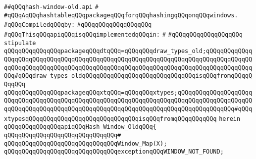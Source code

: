 \label{src/lib/x-kit/xclient/src/window/hash-window-old.api}
\verb|##qQQqhash-window-old.api|\newline
\verb|#|\newline
\verb|#qQQqAqQQqhashtableqQQqpackageqQQqforqQQqhashingqQQqonqQQqwindows.|\newline
\newline
\verb|#qQQqCompiledqQQqby:|\newline
\verb|#qQQqqQQqqQQqqQQqqQQq|\newline
\newline
\newline
\verb|#qQQqThisqQQqapiqQQqisqQQqimplementedqQQqin:|\newline
\verb|#|\newline
\verb|#qQQqqQQqqQQqqQQqqQQq|\newline
\newline
\verb|stipulate|\newline
\verb|qQQqqQQqqQQqqQQqpackageqQQqdtqQQq=qQQqqQQqdraw_types_old;qQQqqQQqqQQqqQQqqQQqqQQqqQQqqQQqqQQqqQQqqQQqqQQqqQQqqQQqqQQqqQQqqQQqqQQqqQQqqQQqqQQqqQQqqQQqqQQqqQQqqQQqqQQqqQQqqQQqqQQqqQQqqQQqqQQqqQQqqQQqqQQqqQQqqQQqqQQq#qQQqdraw_types_oldqQQqqQQqqQQqqQQqqQQqqQQqqQQqqQQqisqQQqfromqQQqqQQqqQQq|\newline
\verb|qQQqqQQqqQQqqQQqpackageqQQqxtqQQq=qQQqqQQqxtypes;qQQqqQQqqQQqqQQqqQQqqQQqqQQqqQQqqQQqqQQqqQQqqQQqqQQqqQQqqQQqqQQqqQQqqQQqqQQqqQQqqQQqqQQqqQQqqQQqqQQqqQQqqQQqqQQqqQQqqQQqqQQqqQQqqQQqqQQqqQQqqQQqqQQqqQQqqQQq#qQQqxtypesqQQqqQQqqQQqqQQqqQQqqQQqqQQqqQQqisqQQqfromqQQqqQQqqQQq|\newline
\verb|herein|\newline
\verb|qQQqqQQqqQQqqQQqapiqQQqHash_Window_OldqQQq{|\newline
\verb|qQQqqQQqqQQqqQQqqQQqqQQqqQQqqQQq#|\newline
\verb|qQQqqQQqqQQqqQQqqQQqqQQqqQQqqQQqWindow_Map(X);|\newline
\newline
\verb|qQQqqQQqqQQqqQQqqQQqqQQqqQQqqQQqexceptionqQQqWINDOW_NOT_FOUND;|\newline
